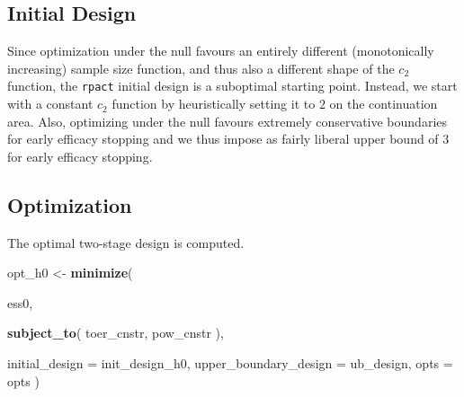\documentclass[
]{book}
\newenvironment{Shaded}{\begin{snugshade}}{\end{snugshade}}
\newcommand{\DataTypeTok}[1]{\textcolor[rgb]{0.13,0.29,0.53}{#1}}
\newcommand{\DecValTok}[1]{\textcolor[rgb]{0.00,0.00,0.81}{#1}}
\newcommand{\FloatTok}[1]{\textcolor[rgb]{0.00,0.00,0.81}{#1}}
\newcommand{\KeywordTok}[1]{\textcolor[rgb]{0.13,0.29,0.53}{\textbf{#1}}}
\newcommand{\NormalTok}[1]{#1}
\newcommand{\OperatorTok}[1]{\textcolor[rgb]{0.81,0.36,0.00}{\textbf{#1}}}
\newcommand{\StringTok}[1]{\textcolor[rgb]{0.31,0.60,0.02}{#1}}
\begin{document}
\hypertarget{initial-design}{%
\subsection{Initial Design}\label{initial-design}}

Since optimization under the null favours an entirely different
(monotonically increasing) sample size function,
and thus also a different shape of the \(c_2\) function,
the \texttt{rpact} initial design is a suboptimal starting point.
Instead, we start with a constant \(c_2\) function by heuristically
setting it to \(2\) on the continuation area.
Also, optimizing under the null favours extremely conservative
boundaries for early efficacy stopping and we thus impose as fairly
liberal upper bound of \(3\) for early efficacy stopping.

\begin{Shaded}
\end{Shaded}

\hypertarget{optimization-1}{%
\subsection{Optimization}\label{optimization-1}}

The optimal two-stage design is computed.

\begin{Shaded}
\begin{Highlighting}[]
\NormalTok{opt_h0 <-}\StringTok{ }\KeywordTok{minimize}\NormalTok{(}
  
\NormalTok{    ess0,}
    
    \KeywordTok{subject_to}\NormalTok{(}
\NormalTok{        toer_cnstr,}
\NormalTok{        pow_cnstr}
\NormalTok{    ),}
    
    \DataTypeTok{initial_design        =}\NormalTok{ init_design_h0,}
    \DataTypeTok{upper_boundary_design =}\NormalTok{ ub_design,}
    \DataTypeTok{opts =}\NormalTok{ opts )}
\end{Highlighting}
\end{Shaded}
\end{document}
